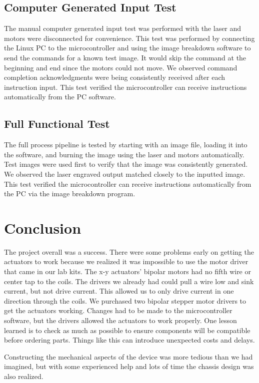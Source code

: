 \documentclass[11pt]{LaTeX-Classes/math-hw}
\begin{document}
\subsection{Computer Generated Input Test}
The manual computer generated input test was performed with
the laser and motors were disconnected for convenience. This test was performed by
connecting the Linux PC to the microcontroller and using the image breakdown software to send the commands for
a known test image. It would skip the  command at the beginning and end since the motors
could not move.
We observed command completion acknowledgments were being consistently received after each instruction input.
This test verified the microcontroller can receive instructions automatically from the PC software.

\subsection{Full Functional Test}
The full process pipeline is tested by starting with an image file, loading it into the software,
and burning the image using the laser and motors automatically.
Test images were used first to verify that the image was consistently generated. We observed the laser engraved output matched closely to the inputted image. This test verified the microcontroller can receive instructions automatically from the PC via the image breakdown program.

\section{Conclusion}
The project overall was a success. There were some problems early on getting the actuators to work because we realized it was impossible to use the motor driver that came in our lab kits.
The x-y actuators' bipolar motors had no fifth wire or center tap to the coils.
The drivers we already had could pull a wire low and sink current, but not drive current.
This allowed us to only drive current in one direction through the coils.
We purchased two bipolar stepper motor drivers to get the actuators working.
Changes had to be made to the microcontroller software, but the drivers allowed the
actuators to work properly.
One lesson learned is to check as much as possible to ensure components will be compatible
before ordering parts. Things like this can introduce unexpected costs and delays.

Constructing the mechanical aspects of the device was more tedious than we had imagined,
but with some experienced help and lots of time the chassis design was also realized. 
\end{document}
